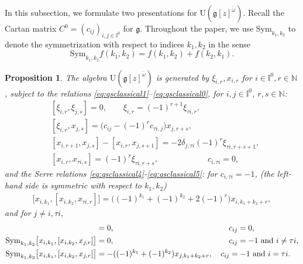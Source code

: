 \documentclass[11pt,reqno]{amsart}
\numberwithin{equation}{section}
\newtheorem{prop}[thm]{Proposition}
\theoremstyle{definition}
\theoremstyle{remark}
\newcommand{\bC}{\mathbb{C}}
\newcommand{\bN}{\mathbb{N}}
\newcommand{\sfh}{\mathsf{h}}
\newcommand{\sfe}{\mathsf{e}}
\newcommand{\sff}{\mathsf{f}}
\newcommand{\g}{\mathfrak{g}}
\newcommand{\gge}{\geqslant}
\newcommand{\Sym}{{\mathrm{Sym}}}
\newcommand{\rU}{{\mathrm{U}}}
\def \I{\mathbb{I}}
\def \Sym{\mathrm{Sym}}
\begin{document}

In this subsection, we formulate two presentations for $\mathrm{U}(\g[z]^{\check\omega})$.
Recall the Cartan matrix $C^0=(c_{ij})_{i,j\in\I^0}$ for $\g$. Throughout the paper, we use $\Sym_{k_1,k_2}$ to denote the symmetrization with respect to indices $k_1, k_2$ in the sense
\[
\Sym_{k_1,k_2} f(k_1, k_2) =f(k_1, k_2) +f(k_2, k_1).
\]
\begin{prop}\label{prop:qscrel}
The algebra $\rU(\g[z]^{\check\omega})$ is generated by $\xi_{i,r},x_{i,r}$ for $i\in \I^0,r\in\bN$, subject to the relations \eqref{eq:qsclassical1}--\eqref{eq:qsclassical0}, for $i,j\in\I^0$, $r,s\in \bN$:
\begin{align}
\label{eq:qsclassical1}
&[\xi_{i,r},\xi_{j,s}]=0,\qquad \xi_{i,r} =(-1)^{r+1} \xi_{\tau i,r},
\\
\label{eq:qsclassical2}
&[\xi_{i,r},x_{j,s}]=\big(c_{ij}-(-1)^r c_{\tau i,j} \big) x_{j,r+s},
\\
\label{eq:qsclassical3}
&[x_{i,r+1},x_{j,s}]-[x_{i,r},x_{j,s+1}]=-2\delta_{j,\tau i} (-1)^r \xi_{\tau i,r+s+1}, 
\\
&[x_{i,r},x_{\tau i,s}]=(-1)^r \xi_{\tau i,r+s},\qquad\qquad \qquad  c_{i,\tau i}=0,\label{eq:qsclassical0}
\end{align}
and the Serre relations \eqref{eq:qsclassical4}-\eqref{eq:qsclassical5}: for $c_{i,\tau i}=-1$, (the left-hand side is symmetric with respect to $k_1,k_2$)
\begin{align}
\big[x_{i,k_1},[x_{i,k_2},x_{\tau i,r}]\big]  
= \big((-1)^{k_1} +(-1)^{k_2} +2(-1)^r\big) x_{i,k_1+k_2+r},
\label{eq:qsclassical4}
\end{align}
and for $j\neq i,\tau i,$
\begin{align}
[x_{i,k},x_{j,r}]&=0,\hskip5.13cm c_{ij}=0,\label{eq:qsclassical6}
\\
\Sym_{k_1,k_2}\big[x_{i,k_1},[x_{i,k_2},x_{j,r}]\big] & =0,\hskip5.13cm c_{ij}=-1 \text{ and }i\ne \tau i,\\
\Sym_{k_1,k_2}\big[x_{i,k_1},[x_{i,k_2},x_{j,r}]\big] & =-((-1)^{k_1}+(-1)^{k_2})x_{j,k_1+k_2+r},\quad c_{ij}=-1 \text{ and }i=\tau i.\label{eq:qsclassical5}
\end{align}
\end{prop} 
\end{document}
